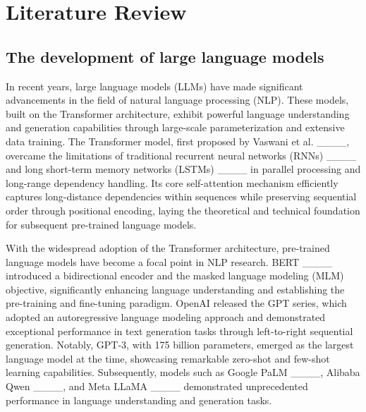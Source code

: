 \section{Literature Review}
\subsection{The development of large language models}
In recent years, large language models (LLMs) have made significant advancements in the field of natural language processing (NLP). These models, built on the Transformer architecture, exhibit powerful language understanding and generation capabilities through large-scale parameterization and extensive data training. The Transformer model, first proposed by Vaswani et al. ____, overcame the limitations of traditional recurrent neural networks (RNNs) ____ and long short-term memory networks (LSTMs) ____ in parallel processing and long-range dependency handling. Its core self-attention mechanism efficiently captures long-distance dependencies within sequences while preserving sequential order through positional encoding, laying the theoretical and technical foundation for subsequent pre-trained language models.

With the widespread adoption of the Transformer architecture, pre-trained language models have become a focal point in NLP research. BERT ____ introduced a bidirectional encoder and the masked language modeling (MLM) objective, significantly enhancing language understanding and establishing the pre-training and fine-tuning paradigm. OpenAI released the GPT series, which adopted an autoregressive language modeling approach and demonstrated exceptional performance in text generation tasks through left-to-right sequential generation. Notably, GPT-3, with 175 billion parameters, emerged as the largest language model at the time, showcasing remarkable zero-shot and few-shot learning capabilities. Subsequently, models such as Google PaLM ____, Alibaba Qwen ____, and Meta LLaMA ____ demonstrated unprecedented performance in language understanding and generation tasks.

